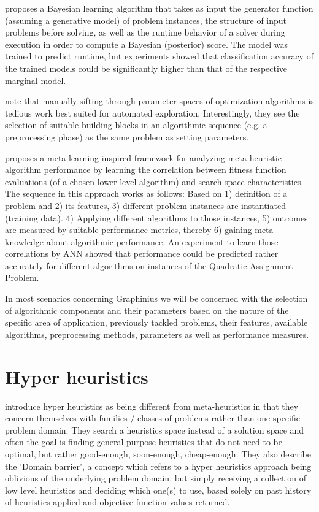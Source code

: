 \cite{Horvitz2001} proposes a Bayesian learning algorithm that takes as input the generator function (assuming a generative model) of problem instances, the structure of input problems before solving, as well as the runtime behavior of a solver during execution in order to compute a Bayesian (posterior) score. The model was trained to predict runtime, but experiments showed that classification accuracy of the trained models could be significantly higher than that of the respective marginal model.

\cite{Hutter2007} note that manually sifting through parameter spaces of optimization algorithms is tedious work best suited for automated exploration. Interestingly, they see the selection of suitable building blocks in an algorithmic sequence (e.g. a preprocessing phase) as the same problem as setting parameters.

\cite{SmithMiles2008} proposes a meta-learning inspired framework for analyzing meta-heuristic algorithm performance by learning the correlation between fitness function evaluations (of a chosen lower-level algorithm) and search space characteristics. The sequence in this approach works as follows: Based on 1) definition of a problem and 2) its features, 3) different problem instances are instantiated (training data). 4) Applying different algorithms to those instances, 5) outcomes are measured by suitable performance metrics, thereby 6) gaining meta-knowledge about algorithmic performance. An experiment to learn those correlations by ANN showed that performance could be predicted rather accurately for different algorithms on instances of the Quadratic Assignment Problem.

In most scenarios concerning Graphinius we will be concerned with the selection of algorithmic components and their parameters based on the nature of the specific area of application, previously tackled problems, their features, available algorithms, preprocessing methods, parameters as well as performance measures.


\section{Hyper heuristics}
\label{sect:hyper_heuristics}

\cite{Burke:2003:Hyperheuristics} introduce hyper heuristics as being different from meta-heuristics in that they concern themselves with families / classes of problems rather than one specific problem domain. They search a heuristics space instead of a solution space and often the goal is finding general-purpose heuristics that do not need to be optimal, but rather good-enough, soon-enough, cheap-enough. They also describe the 'Domain barrier', a concept which refers to a hyper heuristics approach being oblivious of the underlying problem domain, but simply receiving a collection of low level heuristics and deciding which one(s) to use, based solely on past history of heuristics applied and objective function values returned.

